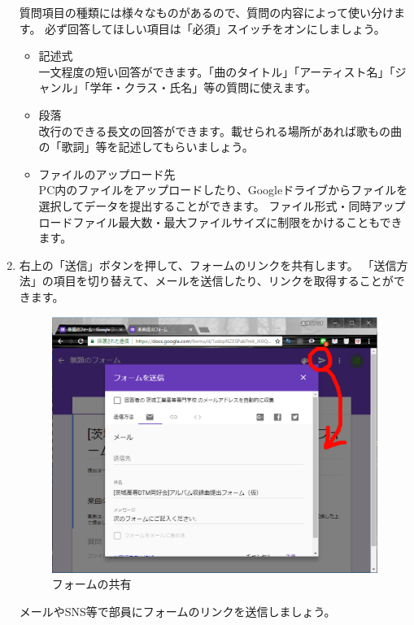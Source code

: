 \documentclass[11pt,a4paper]{jsarticle}
\begin{document}
\begin{enumerate}
                    質問項目の種類には様々なものがあるので、質問の内容によって使い分けます。
                    必ず回答してほしい項目は「必須」スイッチをオンにしましょう。
                    \begin{itemize}
                        \item 記述式 \\
                            一文程度の短い回答ができます。「曲のタイトル」「アーティスト名」「ジャンル」「学年・クラス・氏名」等の質問に使えます。
                        \item 段落 \\
                            改行のできる長文の回答ができます。載せられる場所があれば歌もの曲の「歌詞」等を記述してもらいましょう。
                        \item ファイルのアップロード先 \\
                            PC内のファイルをアップロードしたり、Googleドライブからファイルを選択してデータを提出することができます。
                            ファイル形式・同時アップロードファイル最大数・最大ファイルサイズに制限をかけることもできます。
                    \end{itemize}

                \item 右上の「送信」ボタンを押して、フォームのリンクを共有します。
                    「送信方法」の項目を切り替えて、メールを送信したり、リンクを取得することができます。
                    \begin{figure}[htbp]
                        \begin{center}
                        \includegraphics[width=12.0cm]{./image/form04.eps}
                        \caption{フォームの共有}
                        \label{fig:form04}
                        \end{center}
                    \end{figure}
                    メールやSNS等で部員にフォームのリンクを送信しましょう。


\end{enumerate}
\end{document}
